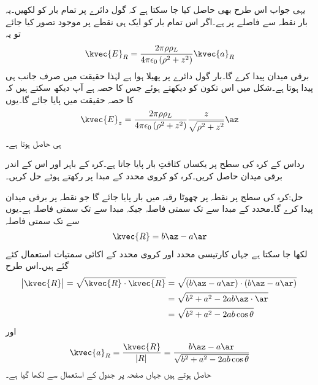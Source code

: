 یہی جواب اس طرح بھی حاصل کیا جا سکتا ہے کہ گول دائرے پر تمام بار کو  لکھیں۔یہ بار نقطہ  سے  فاصلے پر ہے۔اگر اس تمام بار کو ایک ہی نقطے   پر موجود تصور کیا جائے تو یہ
\begin{align*}
\kvec{E}_R=\frac{2\pi\rho\rho_L}{4\pi\epsilon_0 \left(\rho^2+z^2 \right)} \kvec{a}_R
\end{align*}
برقی میدان پیدا کرے گا۔بار گول دائرے پر پھیلا ہوا ہے لہٰذا حقیقت میں صرف  جانب ہی  پیدا ہوتا ہے۔شکل میں اس تکون کو دیکھتے ہوئے جس کا  حصہ ہے  آپ دیکھ سکتے ہیں کہ  کا  حصہ  حقیقت میں پایا جائے گا۔یوں 
\begin{align*}
\kvec{E}_z=\frac{2\pi\rho\rho_L}{4\pi\epsilon_0 \left(\rho^2+z^2 \right)} \frac{z}{\sqrt{\rho^2+z^2}} \az
\end{align*}
ہی حاصل ہوتا ہے۔

رداس  کے کرہ کی سطح پر یکساں کثافتِ بار  پایا جاتا ہے۔کرہ کے باہر اور اس کے اندر برقی میدان   حاصل کریں۔کرہ کو کروی محدد کے مبدا پر رکھتے ہوئے حل کریں۔

حل:کرہ کی سطح پر نقطہ  پر چھوٹا رقبہ  میں بار  پایا جائے گا جو  نقطہ  پر برقی میدان  پیدا کرے گا۔محدد کے مبدا سے  تک سمتی فاصلہ  جبکہ مبدا سے  تک سمتی فاصلہ  ہے۔یوں  سے  تک سمتی فاصلہ 
\begin{align}
\kvec{R}=b\az-a\ar
\end{align}
لکھا جا سکتا ہے جہاں کارتیسی محدد اور کروی محدد کے اکائی سمتیات استعمال کئے گئے ہیں۔اس طرح
\begin{gather}
\begin{aligned}
\abs{\kvec{R}}=\sqrt{\kvec{R} \cdot \kvec{R}}&= \sqrt{(b\az-a\ar)\cdot (b\az-a\ar)}\\
&=\sqrt{b^2+a^2-2 ab \az \cdot \ar}\\
&=\sqrt{b^2+a^2-2 ab \cos \theta}
\end{aligned}
\end{gather}
اور
\begin{align}
\kvec{a}_R=\frac{\kvec{R}}{\abs{R}}=\frac{b\az-a\ar}{\sqrt{b^2+a^2-2 ab \cos \theta}}
\end{align}
حاصل ہوتے ہیں جہاں صفحہ  پر جدول  کے استعمال سے  لکھا گیا ہے۔

